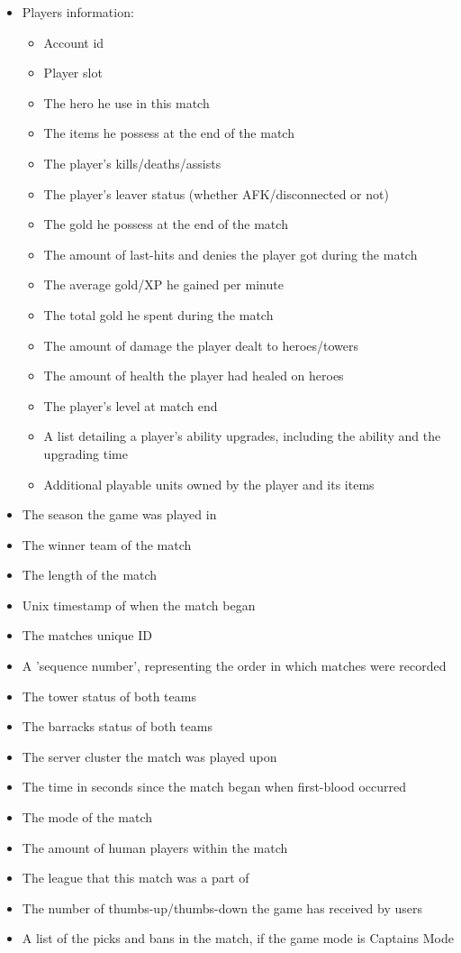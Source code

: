 \documentclass{article}
\begin{document}
\begin{itemize}
	\item Players information:
	\begin{itemize}
		\item Account id
		\item Player slot
		\item The hero he use in this match
		\item The items he possess at the end of the match
		\item The player's kills/deaths/assists
		\item The player's leaver status (whether AFK/disconnected or not)
		\item The gold he possess at the end of the match
		\item The amount of last-hits and denies the player got during the match
		\item The average gold/XP he gained per minute
		\item The total gold he spent during the match
		\item The amount of damage the player dealt to heroes/towers
		\item The amount of health the player had healed on heroes
		\item The player's level at match end
		\item A list detailing a player's ability upgrades, including the ability and the upgrading time
		\item Additional playable units owned by the player and its items
	\end{itemize}
	\item The season the game was played in
	\item The winner team of the match
	\item The length of the match
	\item Unix timestamp of when the match began
	\item The matches unique ID
	\item A 'sequence number', representing the order in which matches were recorded
	\item The tower status of both teams
	\item The barracks status of both teams
	\item The server cluster the match was played upon
	\item The time in seconds since the match began when first-blood occurred
	\item The mode of the match
	\item The amount of human players within the match
	\item The league that this match was a part of
	\item The number of thumbs-up/thumbs-down the game has received by users
	\item A list of the picks and bans in the match, if the game mode is Captains Mode
\end{itemize}
\end{document}
